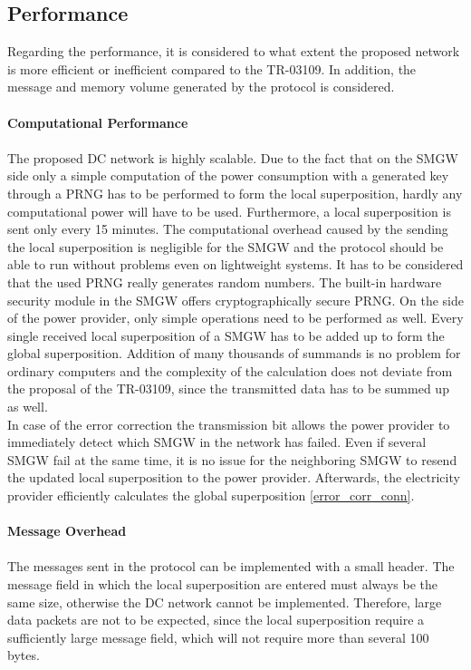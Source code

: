 \subsection{Performance}
\label{performance}
Regarding the performance, it is considered to what extent the proposed network is more efficient or inefficient compared to the \gls{TR-03109}. In addition, the message and memory volume generated by the protocol is considered.
\\
\\
\textbf{Computational Performance}
\\
\\
The proposed DC network is highly scalable. Due to the fact that on the \gls{SMGW} side only a simple computation of the power consumption with a generated key through a \gls{PRNG} has to be performed to form the local superposition, hardly any computational power will have to be used. Furthermore, a local superposition is sent only every 15 minutes. The computational overhead caused by the sending the local superposition is negligible for the \gls{SMGW} and the protocol should be able to run without problems even on lightweight systems. It has to be considered that the used \gls{PRNG} really generates random numbers. The built-in hardware security module in the \gls{SMGW} offers cryptographically secure \gls{PRNG}. On the side of the power provider, only simple operations need to be performed as well. Every single received local superposition of a \gls{SMGW} has to be added up to form the global superposition. Addition of many thousands of summands is no problem for ordinary computers and the complexity of the calculation does not deviate from the proposal of the \gls{TR-03109}, since the transmitted data has to be summed up as well.\\
In case of the error correction the transmission bit allows the power provider to immediately detect which \gls{SMGW} in the network has failed. Even if several \gls{SMGW} fail at the same time, it is no issue for the neighboring \gls{SMGW} to resend the updated local superposition to the power provider. Afterwards, the electricity provider efficiently calculates the global superposition \ref{error_corr_conn}.\\
\\
\textbf{Message Overhead}
\\
\\
The messages sent in the protocol can be implemented with a small header. The message field in which the local superposition are entered must always be the same size, otherwise the DC network cannot be implemented. Therefore, large data packets are not to be expected, since the local superposition require a sufficiently large message field, which will not require more than several 100 bytes. \\
